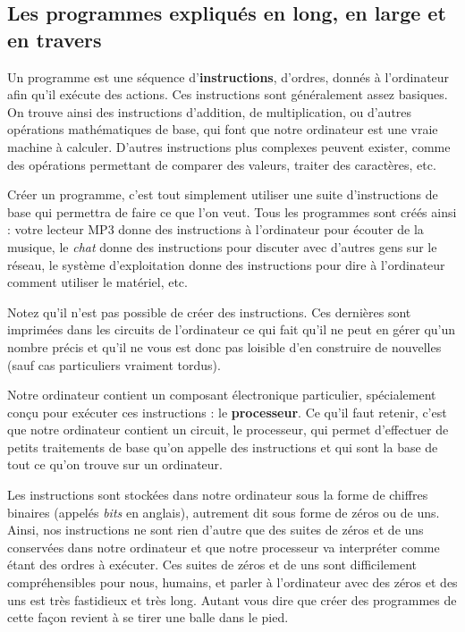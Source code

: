 \subsection{Les programmes expliqués en long, en large et en   travers}
  \label{les-programmes-expliques-en-long-en-large-et-en-travers}

Un programme est une séquence d'\textbf{instructions}, d'ordres,
donnés à l'ordinateur afin qu'il exécute des actions. Ces instructions
sont généralement assez basiques. On trouve ainsi des instructions
d'addition, de multiplication, ou d'autres opérations mathématiques de
base, qui font que notre ordinateur est une vraie machine à calculer.
D'autres instructions plus complexes peuvent exister, comme des
opérations permettant de comparer des valeurs, traiter des caractères,
etc.

Créer un programme, c'est tout simplement utiliser une suite
d'instructions de base qui permettra de faire ce que l'on veut. Tous
les programmes sont créés ainsi : votre lecteur MP3 donne des
instructions à l'ordinateur pour écouter de la musique, le \emph{chat}
donne des instructions pour discuter avec d'autres gens sur le réseau,
le système d'exploitation donne des instructions pour dire à
l'ordinateur comment utiliser le matériel, etc.

\begin{infobox}
Notez qu'il n'est pas possible
    de créer des instructions. Ces dernières sont imprimées dans les
    circuits de l'ordinateur ce qui fait qu'il ne peut en gérer qu'un
    nombre précis et qu'il ne vous est donc pas loisible d'en
    construire de nouvelles (sauf cas particuliers vraiment tordus).
\end{infobox}

Notre ordinateur contient un composant électronique particulier,
spécialement conçu pour exécuter ces instructions : le
\textbf{processeur}. Ce qu'il faut retenir, c'est que notre ordinateur
contient un circuit, le processeur, qui permet d'effectuer de petits
traitements de base qu'on appelle des instructions et qui sont la base
de tout ce qu'on trouve sur un ordinateur.

Les instructions sont stockées dans notre ordinateur sous la forme de
chiffres binaires (appelés \emph{bits} en anglais), autrement dit sous
forme de zéros ou de uns. Ainsi, nos instructions ne sont rien d'autre
que des suites de zéros et de uns conservées dans notre ordinateur et
que notre processeur va interpréter comme étant des ordres à exécuter.
Ces suites de zéros et de uns sont difficilement compréhensibles pour
nous, humains, et parler à l'ordinateur avec des zéros et des uns est
très fastidieux et très long. Autant vous dire que créer des
programmes de cette façon revient à se tirer une balle dans le pied.

